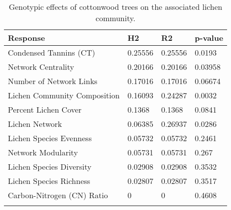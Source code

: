 \begin{table}[ht]
\centering
\begin{tabular}{llll}
  \hline
Response & H2 & R2 & p-value \\ 
  \hline
Condensed Tannins (CT) & 0.25556 & 0.25556 & 0.0193 \\ 
  Network Centrality & 0.20166 & 0.20166 & 0.03958 \\ 
  Number of Network Links & 0.17016 & 0.17016 & 0.06674 \\ 
  Lichen Community Composition & 0.16093 & 0.24287 & 0.0032 \\ 
  Percent Lichen Cover & 0.1368 & 0.1368 & 0.0841 \\ 
  Lichen Network & 0.06385 & 0.26937 & 0.0286 \\ 
  Lichen Species Evenness & 0.05732 & 0.05732 & 0.2461 \\ 
  Network Modularity & 0.05731 & 0.05731 & 0.267 \\ 
  Lichen Species Diversity & 0.02908 & 0.02908 & 0.3532 \\ 
  Lichen Species Richness & 0.02807 & 0.02807 & 0.3517 \\ 
  Carbon-Nitrogen (CN) Ratio & 0 & 0 & 0.4608 \\ 
   &  &  &  \\ 
   \hline
\end{tabular}
\caption{Genotypic effects of cottonwood trees on the associated lichen community.} 
\label{tab:h2_table}
\end{table}
